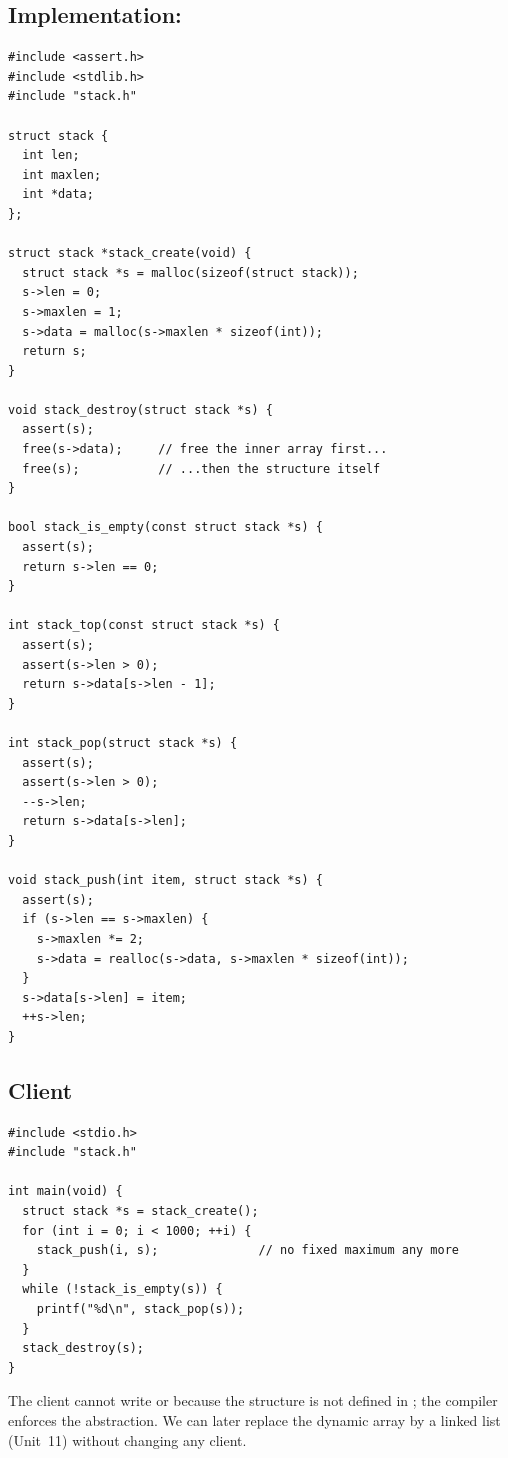 \subsection{Implementation: }
\begin{lstlisting}[style=c]
#include <assert.h>
#include <stdlib.h>
#include "stack.h"

struct stack {
  int len;
  int maxlen;
  int *data;
};

struct stack *stack_create(void) {
  struct stack *s = malloc(sizeof(struct stack));
  s->len = 0;
  s->maxlen = 1;
  s->data = malloc(s->maxlen * sizeof(int));
  return s;
}

void stack_destroy(struct stack *s) {
  assert(s);
  free(s->data);     // free the inner array first...
  free(s);           // ...then the structure itself
}

bool stack_is_empty(const struct stack *s) {
  assert(s);
  return s->len == 0;
}

int stack_top(const struct stack *s) {
  assert(s);
  assert(s->len > 0);
  return s->data[s->len - 1];
}

int stack_pop(struct stack *s) {
  assert(s);
  assert(s->len > 0);
  --s->len;
  return s->data[s->len];
}

void stack_push(int item, struct stack *s) {
  assert(s);
  if (s->len == s->maxlen) {
    s->maxlen *= 2;
    s->data = realloc(s->data, s->maxlen * sizeof(int));
  }
  s->data[s->len] = item;
  ++s->len;
}
\end{lstlisting}

\subsection{Client}
\begin{lstlisting}[style=c]
#include <stdio.h>
#include "stack.h"

int main(void) {
  struct stack *s = stack_create();
  for (int i = 0; i < 1000; ++i) {
    stack_push(i, s);              // no fixed maximum any more
  }
  while (!stack_is_empty(s)) {
    printf("%d\n", stack_pop(s));
  }
  stack_destroy(s);
}
\end{lstlisting}
The client cannot write  or  because the structure is not
defined in ; the compiler enforces the abstraction. We can later replace the
dynamic array by a linked list (Unit~11) without changing any client.

